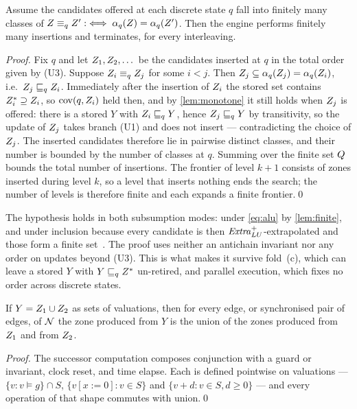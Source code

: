 \begin{theorem}\label{thm:term}
Assume the candidates offered at each discrete state $q$ fall into finitely many
classes of $Z \equiv_q Z' :\iff \alpha_q(Z) = \alpha_q(Z')$.  Then
the engine performs finitely many insertions and terminates, for every
interleaving.
\end{theorem}
\begin{proof}
Fix $q$ and let $Z_1,Z_2,\dots$ be the candidates inserted at $q$ in the
total order given by (U3).  Suppose $Z_i \equiv_q Z_j$ for some $i < j$.
Then $Z_j \subseteq \alpha_q(Z_j) = \alpha_q(Z_i)$, i.e.\ $Z_j
\sqsubseteq_q Z_i$.  Immediately after the insertion of $Z_i$ the stored set
contains $Z_i^{*} \supseteq Z_i$, so $\mathrm{cov}(q,Z_i)$ held then,
and by \cref{lem:monotone} it still holds when $Z_j$ is offered: there is a
stored $Y$ with $Z_i \sqsubseteq_q Y$, hence $Z_j \sqsubseteq_q Y$ by transitivity,
so the update of $Z_j$ takes branch (U1) and does not insert --- contradicting
the choice of $Z_j$.  The inserted candidates therefore lie in pairwise
distinct classes, and their number is bounded by the number of classes at $q$.
Summing over the finite set $Q$ bounds the total number of insertions.
The frontier of level $k+1$ consists of zones inserted during level $k$, so a
level that inserts nothing ends the search; the number of levels is therefore
finite and each expands a finite frontier.\qed
\end{proof}

The hypothesis holds in both subsumption modes: under \cref{eq:alu} by
\cref{lem:finite}, and under inclusion because every candidate is then
$\mathit{Extra}^{+}_{LU}$-extrapolated and those form a finite set~\cite{Daws98,Behrmann06}.
The proof uses neither an antichain invariant nor any order on updates beyond
(U3).  This is what makes it survive fold~(c), which can leave a stored $Y$ with
$Y \sqsubseteq_q Z^{*}$ un-retired, and parallel execution, which fixes no order
across discrete states.

\begin{lemma}\label{lem:union}
If $Y = Z_1 \cup Z_2$ as sets of valuations, then for every edge, or
synchronised pair of edges, of $\mathcal{N}$ the zone produced from $Y$ is the union of
the zones produced from $Z_1$ and from $Z_2$.
\end{lemma}
\begin{proof}
The successor computation composes conjunction with a guard or invariant, clock
reset, and time elapse.  Each is defined pointwise on valuations --- $\{v : v
\models g\} \cap S$, $\{v[x{:=}0] : v \in S\}$ and $\{v + d : v \in S, d \ge 0\}$
--- and every operation of that shape commutes with union.\qed
\end{proof}

